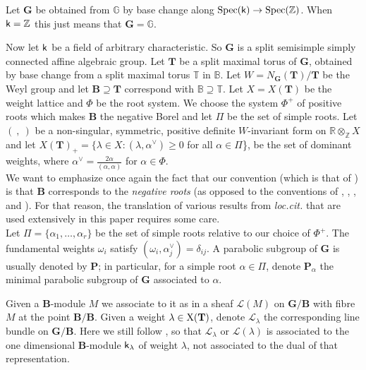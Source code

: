 \documentclass[sn-mathphys-num]{sn-jnl}%
\newcommand{\Ll}{\mathcal L}
\newcommand{\sk}{{\sf k}}
\newcommand{\Gm}{\mathbb G}
\newcommand{\Bm}{\mathbb B}
\newcommand{\Tm}{\mathbb T}
\newcommand{\Z}{{\mathbb Z}}
\newcommand{\bg}{\mathbf G}
\newcommand{\fb}{\mathbf B}
\newcommand{\bt}{\mathbf T}
\newcommand{\bp}{\mathbf P}
\theoremstyle{definition}
\begin{document}
Let  $\bg$  be  obtained from ${\mathbb G}$ by base change along ${\rm Spec}(\sk)\rightarrow {\rm Spec}(\mathbb Z)$.
When $\sk=\Z$ this just means that $\bg=\Gm$. 

Now let $\sk$ be a field of arbitrary characteristic.
So $ \bg$ is a split semisimple simply connected affine algebraic group. 
Let $ \bt$ be a split maximal torus of $ \bg$, obtained by base change from a split maximal torus $\Tm$ in $\Bm$.
Let $W = N_{ \bg}({\bt})/ \bt$ be the Weyl group and let $\fb\supseteq \bt$ correspond with $\Bm\supseteq \Tm$. 
Let $X = X( \bt)$ be the weight lattice and $\Phi$ be the root system. We choose the system $\Phi ^+$ of positive roots which makes $\fb$ the negative Borel and let $\Pi$ be the set of simple roots. 
Let $(~,~)$ be a non-singular, symmetric, positive definite $W$-invariant form on ${\mathbb R}\otimes_{\mathbb Z} X$ and let $X(\bt)_+=\{\lambda \in X: (\lambda,\alpha ^{\vee})\geq 0$ for all $\alpha \in \Pi$\}, be
the set of dominant weights, where $\alpha^\vee =\frac{2\alpha}{(\alpha ,\alpha)}$ for $\alpha \in \Phi$.\\

We want to emphasize once again the fact that our convention (which is that of \cite{Jan}) is that ${\fb}$ corresponds 
to the {\it negative roots} (as opposed to the conventions of \cite{GrahamKumar}, \cite{MathG}, \cite{Polo3}, and \cite{WvdK}). 
For that reason, the translation of various results from {\it loc.cit.} that are used extensively in this paper requires some care.\\ 

Let $\Pi=\{\alpha _1,\dots ,\alpha _r\}$ be the set of simple roots relative to our choice of $\Phi ^+$. The fundamental weights $\omega_i$ satisfy $(\omega_i,\alpha_j^\vee)=\delta_{ij}$.
A parabolic subgroup of $ \bg$ is usually denoted by $ \bp$; in particular, for a simple root $\alpha \in \Pi$, denote ${ \bp}_{\alpha}$ the minimal parabolic subgroup of $ \bg$ associated to $\alpha$. 

Given a $\fb$-module $M$ we associate to it as in \cite[I 5.8]{Jan} a sheaf $\Ll(M)$ on $ \bg/ \fb$ with fibre $M$ at the point $ \fb/ \fb$. Given a weight $\lambda \in  {\rm X}({\bt})$, denote $\Ll _{\lambda}$ the corresponding line bundle on ${ \bg}/{\fb}$.
Here we still follow  \cite{Jan}, so that $\Ll_\lambda$ or $\Ll(\lambda)$ is associated to the one dimensional $\fb$-module $\sk_\lambda$ of weight $\lambda$, not associated to the dual of that representation.\\
\end{document}

